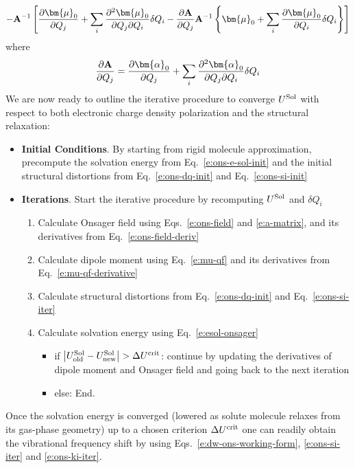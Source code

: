 \documentclass[a4paper,titlepage,twoside,fleqn,12pt]{book}
\newcommand{\BM}[1]{\bm{#1}}
\newcommand{\fderiv}[2]{\ensuremath{
    \frac{\partial #1}{\partial #2}}}
\newcommand{\sderivd}[3]{\ensuremath{
    \frac{\partial^2 #1}{\partial #2 \partial #3}
    }}
\begin{document}
\begin{refsection}
\begin{equation}
- {\bf A}^{-1} 
   \left[ 
       \fderiv{{\BM \mu}_0}{Q_j} 
      + \sum_i \sderivd{{\BM \mu}_0}{Q_j}{Q_i} \delta Q_i 
      - \fderiv{{\bf A}}{Q_j}  {\bf A}^{-1}  
           \left\{ 
               {\BM \mu}_0 + \sum_i \fderiv{{\BM \mu}_0}{Q_i}\delta Q_i
           \right\}
   \right]
\end{equation}
%
where
%
\begin{equation}
  \fderiv{{\bf A}}{Q_j} = \fderiv{{\BM \alpha}_0}{Q_j} 
               + \sum_i \sderivd{{\BM \alpha}_0}{Q_j}{Q_i} \delta Q_i
\end{equation}
%
We are now ready to outline the iterative procedure
to converge $U^{\rm Sol}$ with respect to both electronic
charge density polarization and the structural
relaxation:
%
\begin{itemize}
\item[\textbullet] {\bf Initial Conditions}. 
                        By starting from rigid molecule approximation,
                        precompute the solvation energy from Eq.~\eqref{e:ons-e-sol-init}
                        and the initial structural distortions
                        from Eq.~\eqref{e:ons-dq-init} and 
                        Eq.~\eqref{e:ons-si-init}
\item[\textbullet] {\bf Iterations}. Start the iterative procedure 
                        by recomputing $U^{\rm Sol}$ and $\delta Q_i$
\begin{enumerate}
 \item Calculate Onsager field using Eqs.~\eqref{e:ons-field} and \eqref{e:a-matrix}, 
       and its derivatives from Eq.~\eqref{e:ons-field-deriv}
 \item Calculate dipole moment using Eq.~\eqref{e:mu-qf} 
       and its derivatives from Eq.~\eqref{e:mu-qf-derivative}
 \item Calculate structural distortions from Eq.~\eqref{e:ons-dq-init}
       and Eq.~\eqref{e:ons-si-iter}
 \item Calculate solvation energy using Eq.~\eqref{e:esol-onsager}
 \begin{itemize}
      \item if $\left| U^{\rm Sol}_{\rm old} - U^{\rm Sol}_{\rm new}\right| > \Delta U^{\rm crit}$:
            continue by updating the derivatives of dipole moment and Onsager field
            and going back to the next iteration
      \item else: End. 
 \end{itemize}    
\end{enumerate}
\end{itemize}
%
Once the solvation energy is converged 
(lowered as solute molecule
relaxes from its gas\hyp{}phase geometry) 
up to a chosen criterion $\Delta U^{\rm crit}$
one can readily obtain
the vibrational frequency shift by using Eqs.~\eqref{e:dw-ons-working-form},
\eqref{e:ons-si-iter} and \eqref{e:ons-ki-iter}.


\end{refsection}
\end{document}
